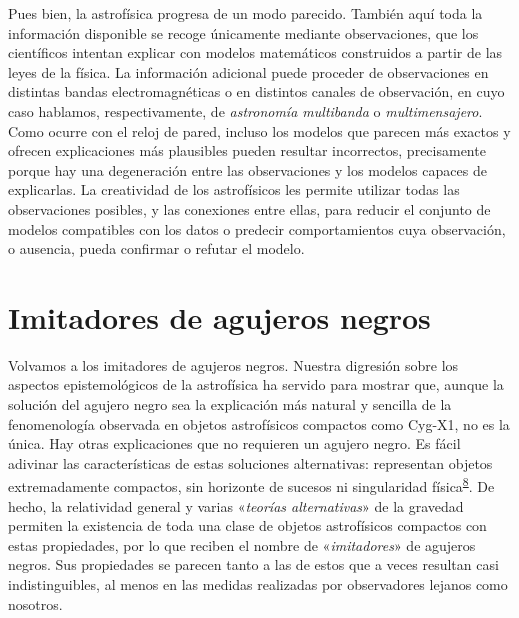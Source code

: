 Pues bien, la astrofísica progresa de un modo parecido. También aquí toda la información disponible se recoge únicamente mediante observaciones, que los científicos intentan explicar con modelos matemáticos construidos a partir de las leyes de la física. La información adicional puede proceder de observaciones en distintas bandas electromagnéticas o en distintos canales de observación, en cuyo caso hablamos, respectivamente, de \emph{astronomía multibanda} o \emph{multimensajero}. Como ocurre con el reloj de pared, incluso los modelos que parecen más exactos y ofrecen explicaciones más plausibles pueden resultar incorrectos, precisamente porque hay una degeneración entre las observaciones y los modelos capaces de explicarlas. La creatividad de los astrofísicos les permite utilizar todas las observaciones posibles, y las conexiones entre ellas, para reducir el conjunto de modelos compatibles con los datos o predecir comportamientos cuya observación, o ausencia, pueda confirmar o refutar el modelo.

\section{Imitadores de agujeros negros}\label{sec:06-mimickers}

Volvamos a los imitadores de agujeros negros. Nuestra digresión sobre los aspectos epistemológicos de la astrofísica ha servido para mostrar que, aunque la solución del agujero negro sea la explicación más natural y sencilla de la fenomenología observada en objetos astrofísicos compactos como Cyg-X1, no es la única. Hay otras explicaciones que no requieren un agujero negro. Es fácil adivinar las características de estas soluciones alternativas: representan objetos extremadamente compactos, sin horizonte de sucesos ni singularidad física\textsuperscript{\hyperlink{note:06-08}{8}}. De hecho, la relatividad general y varias «\emph{teorías alternativas}» de la gravedad permiten la existencia de toda una clase de objetos astrofísicos compactos con estas propiedades, por lo que reciben el nombre de «\emph{imitadores}» de agujeros negros. Sus propiedades se parecen tanto a las de estos que a veces resultan casi indistinguibles, al menos en las medidas realizadas por observadores lejanos como nosotros.

